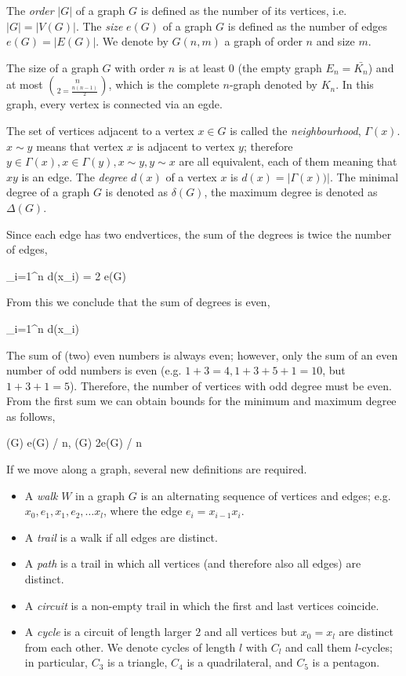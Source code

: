 The \emph{order} $|G|$ of a graph $G$ is defined as the number of its vertices, i.e. $|G| = |V(G)|$. The \emph{size} $e(G)$ of a graph $G$ is defined as the number of edges $e(G) = |E(G)|$. We denote by $G(n,m)$ a graph of order $n$ and size $m$.

The size of a graph $G$ with order $n$ is at least $0$ (the empty graph $E_n = \bar{K_n}$) and at most ${n} \choose {2} = \frac{n(n-1)}{2}$, which is the complete $n$-graph denoted by $K_n$. In this graph, every vertex is connected via an egde.

The set of vertices adjacent to a vertex $x \in G$ is called the \emph{neighbourhood}, $\Gamma(x)$. $x \sim y$ means that vertex $x$ is adjacent to vertex $y$; therefore $y \in \Gamma(x), x \in \Gamma(y), x \sim y, y \sim x$ are all equivalent, each of them meaning that $xy$ is an edge. The \emph{degree} $d(x)$ of a vertex $x$ is $d(x) = |\Gamma(x))|$. The minimal degree of a graph $G$ is denoted as $\delta(G)$, the maximum degree is denoted as $\Delta(G)$.

Since each edge has two endvertices, the sum of the degrees is twice the number of edges,

\be\label{eq:graph_03:01}
\sum_{i=1}^n d(x_i) = 2 e(G)
\ee

From this we conclude that the sum of degrees is even,

\bee
\sum_{i=1}^n d(x_i)  
\eee

The sum of (two) even numbers is always even; however, only the sum of an even number of odd numbers is even (e.g. $1+3=4, 1+3+5+1 = 10$, but $1+3+1 = 5$). Therefore, the number of vertices with odd degree must be even. From the first sum we can obtain bounds for the minimum and maximum degree as follows,

\bee
\delta(G)  e(G) / n, \quad \Delta (G) \geq 2e(G) / n
\eee


If we move along a graph, several new definitions are required.

\begin{itemize}
\item A \emph{walk} $W$ in a graph $G$ is an alternating sequence of vertices and edges; e.g. $x_0, e_1, x_1, e_2, \ldots x_l$, where the edge $e_i = x_{i-1}x_i$.
\item A \emph{trail} is a walk if all edges are distinct.
\item A \emph{path} is a trail in which all vertices (and therefore also all edges) are distinct.
\item A \emph{circuit} is a non-empty trail in which the first and last vertices coincide.
\item A \emph{cycle} is a circuit of length larger $2$ and all vertices but $x_0=x_l$ are distinct from each other. We denote cycles of length $l$ with $C_l$ and call them $l$-cycles; in particular, $C_3$ is a triangle, $C_4$ is a quadrilateral, and $C_5$ is a pentagon.
\end{itemize}

